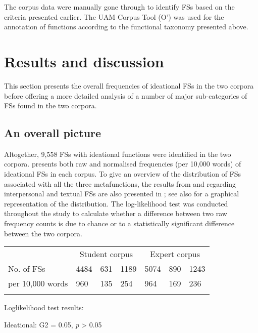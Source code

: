 The corpus data were manually gone through to identify FSs based on the criteria presented earlier. The UAM Corpus Tool (O’\citealt{Donnell2013}) was used for the annotation of functions according to the functional taxonomy presented above.

\section{Results and discussion}

This section presents the overall frequencies of ideational FSs in the two corpora before offering a more detailed analysis of a number of major sub-categories of FSs found in the two corpora.

\subsection{An overall picture}

Altogether, 9,558 FSs with ideational functions were identified in the two corpora.  presents both raw and normalised frequencies (per 10,000 words) of ideational FSs in each corpus. To give an overview of the distribution of FSs associated with all the three metafunctions, the results from \citet{Wang2018} and  regarding interpersonal and textual FSs are also presented in ; see also  for a graphical representation of the distribution. The log-likelihood test was conducted throughout the study to calculate whether a difference between two raw frequency counts is due to chance or to a statistically significant difference between the two corpora. 


\begin{tabularx}{\textwidth}{XXXXXXX} & \multicolumn{3}{c}{ Student corpus} & \multicolumn{3}{c}{ Expert corpus}\\

\lsptoprule
No. of FSs & 4484 & 631 & 1189 & 5074 & 890 & 1243\\
per 10,000 words & 960 & 135 & 254 & 964 & 169 & 236\\
\lspbottomrule
\end{tabularx}
Loglikelihood test results:

Ideational: G2 = 0.05, \textit{p} > 0.05

